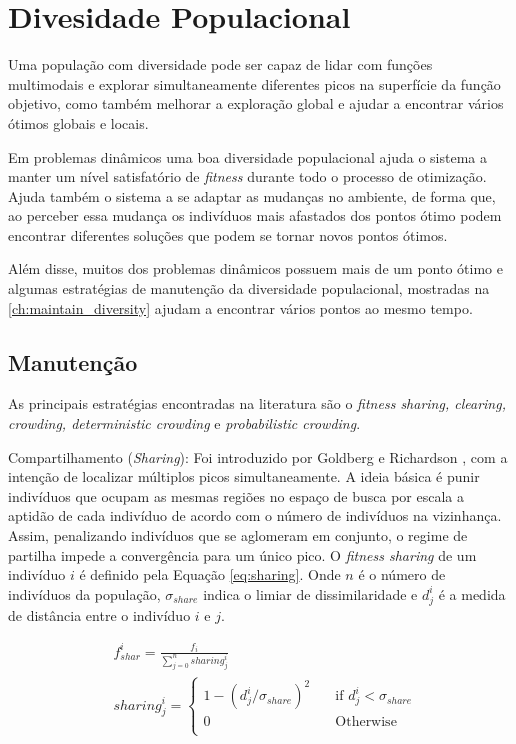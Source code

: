 \section{Divesidade Populacional}
\label{sec:population_diversity}
Uma população com diversidade pode ser capaz de lidar com funções multimodais e explorar simultaneamente diferentes picos na superfície da função objetivo, como também melhorar a exploração global e ajudar a encontrar vários ótimos globais e locais.

Em problemas dinâmicos uma boa diversidade populacional ajuda o sistema a manter um nível satisfatório de \textit{fitness} durante todo o processo de otimização. Ajuda também o sistema a se adaptar as mudanças no ambiente, de forma que, ao perceber essa mudança os indivíduos mais afastados dos pontos ótimo podem encontrar diferentes soluções que podem se tornar novos pontos ótimos.

Além disse, muitos dos problemas dinâmicos possuem mais de um ponto ótimo e algumas estratégias de manutenção da diversidade populacional, mostradas na \ref{ch:maintain_diversity} ajudam a encontrar vários pontos ao mesmo tempo.

\subsection{Manutenção}
\label{sec:maintain_diversity}
As principais estratégias encontradas na literatura são o \textit{fitness sharing, clearing, crowding, deterministic crowding} e \textit{probabilistic crowding}.

Compartilhamento (\textit{Sharing}): Foi introduzido por Goldberg e Richardson \cite{sharing}, com a intenção de localizar múltiplos picos simultaneamente. A ideia básica é punir indivíduos que ocupam as mesmas regiões no espaço de busca por escala a aptidão de cada indivíduo de acordo com o número de indivíduos na vizinhança. Assim, penalizando indivíduos que se aglomeram em conjunto, o regime de partilha impede a convergência para um único pico. O \textit{fitness sharing} de um indivíduo $i$ é definido pela Equação \ref{eq:sharing}. Onde $n$ é o número de indivíduos da população, $\sigma_{share}$ indica o limiar de dissimilaridade e $d_j^i$ é a medida de distância entre o indivíduo $i$ e $j$.

\begin{equation}
\label{eq:sharing}
\begin{split}
& f_{shar}^i = \frac{f_i}{\sum_{j=0}^{n} sharing_j^i} \\
& sharing_j^i =
	\begin{cases}
	1 - (d_j^i/\sigma_{share})^2 	& \quad \text{if } d_j^i < \sigma_{share}\\
	0 							& \quad \text{Otherwise}\\
	\end{cases} 
\end{split}
\end{equation}

